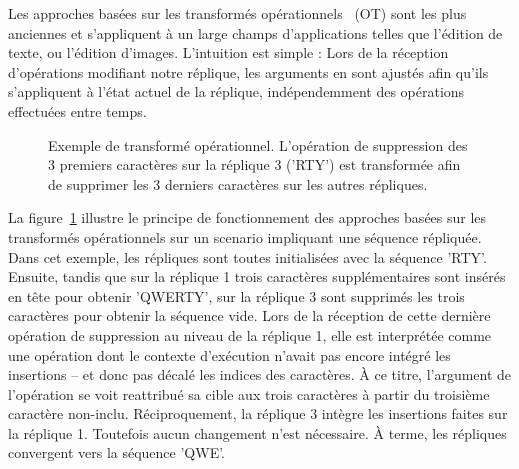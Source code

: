 Les approches basées sur les transformés opérationnels~\cite{sun1998operational,
  sun2009contextbased} (OT) sont les plus anciennes et s'appliquent à un large
champs d'applications telles que l'édition de texte, ou l'édition
d'images. L'intuition est simple : Lors de la réception d'opérations modifiant
notre réplique, les arguments en sont ajustés afin qu'ils s'appliquent à l'état
actuel de la réplique, indépendemment des opérations effectuées entre temps.

\begin{figure}
  \centering
  
  \caption{\label{repl:fig:otexample} Exemple de transformé
    opérationnel. L'opération de suppression des 3 premiers caractères sur la
    réplique 3 ('RTY') est transformée afin de supprimer les 3 derniers caractères
    sur les autres répliques.}
\end{figure}

La figure~\ref{repl:fig:otexample} illustre le principe de fonctionnement des
approches basées sur les transformés opérationnels sur un scenario impliquant
une séquence répliquée. Dans cet exemple, les répliques sont toutes initialisées
avec la séquence 'RTY'. Ensuite, tandis que sur la réplique 1 trois caractères
supplémentaires sont insérés en tête pour obtenir 'QWERTY', sur la réplique 3
sont supprimés les trois caractères pour obtenir la séquence vide. Lors de la
réception de cette dernière opération de suppression au niveau de la réplique 1,
elle est interprétée comme une opération dont le contexte d'exécution n'avait
pas encore intégré les insertions -- et donc pas décalé les indices des
caractères. À ce titre, l'argument de l'opération se voit reattribué sa cible
aux trois caractères à partir du troisième caractère non-inclu. Réciproquement,
la réplique 3 intègre les insertions faites sur la réplique 1. Toutefois aucun
changement n'est nécessaire. À terme, les répliques convergent vers la séquence
'QWE'.

